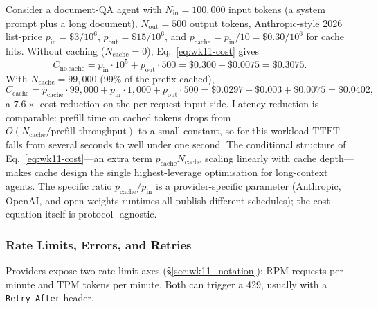 \begin{workedexample}
Consider a document-QA agent with $N_\mathrm{in} = 100{,}000$
input tokens (a system prompt plus a long document),
$N_\mathrm{out} = 500$ output tokens, Anthropic-style 2026
list-price $p_\mathrm{in} = \$3/10^6$,
$p_\mathrm{out} = \$15/10^6$, and
$p_\mathrm{cache} = p_\mathrm{in}/10 = \$0.30/10^6$ for cache
hits. Without caching ($N_\mathrm{cache} = 0$),
Eq.~\eqref{eq:wk11-cost} gives
\[
  C_\mathrm{no\,cache}
  = p_\mathrm{in}\cdot 10^5 + p_\mathrm{out}\cdot 500
  = \$0.300 + \$0.0075
  = \$0.3075.
\]
With $N_\mathrm{cache} = 99{,}000$ (99\% of the prefix cached),
\[
  C_\mathrm{cache}
  = p_\mathrm{cache}\cdot 99{,}000 + p_\mathrm{in}\cdot 1{,}000
    + p_\mathrm{out}\cdot 500
  = \$0.0297 + \$0.003 + \$0.0075
  = \$0.0402,
\]
a $7.6\times$ cost reduction on the per-request input side.
Latency reduction is comparable: prefill time on cached tokens
drops from $O(N_\mathrm{cache} / \text{prefill throughput})$ to a
small constant, so for this workload $\mathrm{TTFT}$ falls from
several seconds to well under one second. The conditional
structure of Eq.~\eqref{eq:wk11-cost}---an extra term
$p_\mathrm{cache} N_\mathrm{cache}$ scaling linearly with cache
depth---makes cache design the single highest-leverage
optimisation for long-context agents. The specific ratio
$p_\mathrm{cache}/p_\mathrm{in}$ is a provider-specific parameter
(Anthropic, OpenAI, and open-weights runtimes all publish
different schedules); the cost equation itself is protocol-
agnostic.
\end{workedexample}

\subsubsection{Rate Limits, Errors, and Retries}

Providers expose two rate-limit axes (\S\ref{sec:wk11_notation}):
$\mathrm{RPM}$ requests per minute and $\mathrm{TPM}$ tokens per
minute. Both can trigger a 429, usually with a \texttt{Retry-After}
header.

